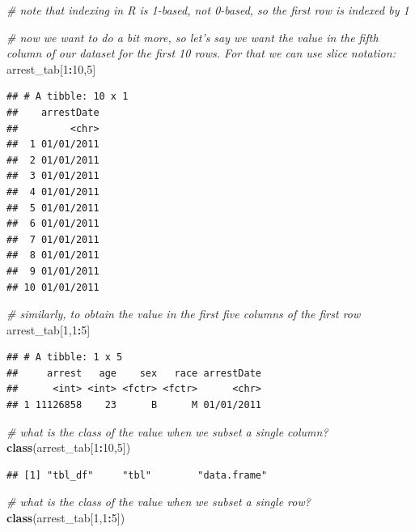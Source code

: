 \documentclass[]{book}
\newenvironment{Shaded}{\begin{snugshade}}{\end{snugshade}}
\newcommand{\KeywordTok}[1]{\textcolor[rgb]{0.13,0.29,0.53}{\textbf{#1}}}
\newcommand{\DecValTok}[1]{\textcolor[rgb]{0.00,0.00,0.81}{#1}}
\newcommand{\CommentTok}[1]{\textcolor[rgb]{0.56,0.35,0.01}{\textit{#1}}}
\newcommand{\OperatorTok}[1]{\textcolor[rgb]{0.81,0.36,0.00}{\textbf{#1}}}
\newcommand{\NormalTok}[1]{#1}
\theoremstyle{definition}
\theoremstyle{definition}
\theoremstyle{remark}
\begin{document}
\begin{Shaded}
\begin{Highlighting}[]
\CommentTok{# note that indexing in R is 1-based, not 0-based, so the first row is indexed by 1}

\CommentTok{# now we want to do a bit more, so let's say we want the value in the fifth column of our dataset for the first 10 rows. For that we can use slice notation:}
\NormalTok{arrest_tab[}\DecValTok{1}\OperatorTok{:}\DecValTok{10}\NormalTok{,}\DecValTok{5}\NormalTok{]}
\end{Highlighting}
\end{Shaded}

\begin{verbatim}
## # A tibble: 10 x 1
##    arrestDate
##         <chr>
##  1 01/01/2011
##  2 01/01/2011
##  3 01/01/2011
##  4 01/01/2011
##  5 01/01/2011
##  6 01/01/2011
##  7 01/01/2011
##  8 01/01/2011
##  9 01/01/2011
## 10 01/01/2011
\end{verbatim}

\begin{Shaded}
\begin{Highlighting}[]
\CommentTok{# similarly, to obtain the value in the first five columns of the first row}
\NormalTok{arrest_tab[}\DecValTok{1}\NormalTok{,}\DecValTok{1}\OperatorTok{:}\DecValTok{5}\NormalTok{]}
\end{Highlighting}
\end{Shaded}

\begin{verbatim}
## # A tibble: 1 x 5
##     arrest   age    sex   race arrestDate
##      <int> <int> <fctr> <fctr>      <chr>
## 1 11126858    23      B      M 01/01/2011
\end{verbatim}

\begin{Shaded}
\begin{Highlighting}[]
\CommentTok{# what is the class of the value when we subset a single column?}
\KeywordTok{class}\NormalTok{(arrest_tab[}\DecValTok{1}\OperatorTok{:}\DecValTok{10}\NormalTok{,}\DecValTok{5}\NormalTok{])}
\end{Highlighting}
\end{Shaded}

\begin{verbatim}
## [1] "tbl_df"     "tbl"        "data.frame"
\end{verbatim}

\begin{Shaded}
\begin{Highlighting}[]
\CommentTok{# what is the class of the value when we subset a single row?}
\KeywordTok{class}\NormalTok{(arrest_tab[}\DecValTok{1}\NormalTok{,}\DecValTok{1}\OperatorTok{:}\DecValTok{5}\NormalTok{])}
\end{Highlighting}
\end{Shaded}
\end{document}
